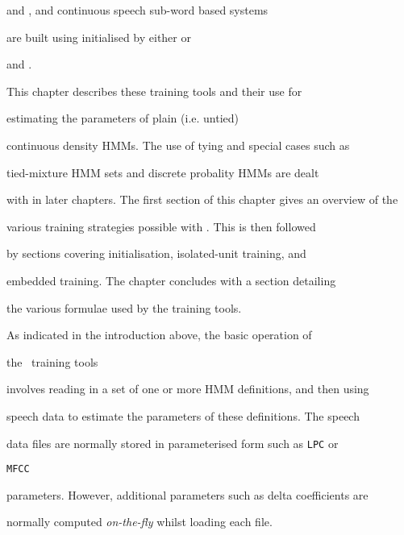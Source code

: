 and , and continuous speech sub-word based systems


are built using  initialised by either  or


 and .





This chapter describes these training tools and their use for 


estimating the parameters of plain (i.e. untied)


continuous density HMMs. The use of tying and special cases such as


tied-mixture HMM sets and discrete probality HMMs are dealt 


with in later chapters.  The first section of this chapter gives an overview of the


various training strategies possible with \HTK.  This is then followed


by sections covering initialisation, isolated-unit training, and


embedded training.  The chapter concludes with a section detailing


the various formulae used by the training tools.










As indicated in the introduction above, the basic operation of 


the \HTK\ training tools


involves  reading in a set of one or more HMM definitions, and then using


speech data to estimate the parameters of  these definitions.  The speech


data files are normally stored in parameterised form such as \texttt{LPC} or 


\texttt{MFCC}


parameters.  However, additional parameters such as delta coefficients are


normally computed \textit{on-the-fly} whilst loading each file.  








